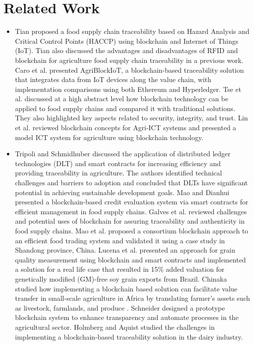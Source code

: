 \section{Related Work}
\begin{itemize}
    \item Tian proposed a food supply chain traceability \cite{bib1} 
    based on Hazard Analysis and Critical Control Points 
    (HACCP) using blockchain and Internet of Things (IoT). 
    Tian also discussed the advantages and disadvantages of 
    RFID and blockchain for agriculture food supply chain 
    traceability in a previous work. Caro et al. presented 
    AgriBlockIoT, a blockchain-based traceability solution 
    that integrates data from IoT devices along the value 
    chain, with implementation comparisons using both 
    Ethereum and Hyperledger. Tse et al. discussed at a high 
    abstract level how blockchain technology can be applied 
    to food supply chains and compared it with traditional 
    solutions. They also highlighted key aspects related to 
    security, integrity, and trust. Lin et al. reviewed 
    blockchain concepts for Agri-ICT systems and presented 
    a model ICT system for agriculture using blockchain 
    technology.
    
    \item Tripoli and Schmidhuber discussed the application of \cite{bib2}
    distributed ledger technologies (DLT) and smart 
    contracts for increasing efficiency and providing 
    traceability in agriculture. The authors identified 
    technical challenges and barriers to adoption and 
    concluded that DLTs have significant potential in 
    achieving sustainable development goals. Mao and 
    Dianhui presented a blockchain-based credit evaluation 
    system via smart contracts for efficient management in 
    food supply chains. Galves et al. reviewed challenges and 
    potential uses of blockchain for assuring traceability and 
    authenticity in food supply chains. Mao et al. proposed a 
    consortium blockchain approach to an efficient food 
    trading system and validated it using a case study in 
    Shandong province, China. Lucena et al. presented an 
    approach for grain quality measurement using blockchain 
    and smart contracts and implemented a solution for a real life case that resulted in 15\% added valuation for 
    genetically modified (GM)-free soy grain exports from 
    Brazil. Chinaka studied how implementing a blockchain based solution can facilitate value transfer in small-scale 
    agriculture in Africa by translating farmer's assets such as 
    livestock, farmlands, and produce . Schneider designed a 
    prototype blockchain system to enhance transparency and 
    automate processes in the agricultural sector. Holmberg 
    and Aquist studied the challenges in implementing a 
    blockchain-based traceability solution in the dairy 
    industry.
    

\end{itemize}
